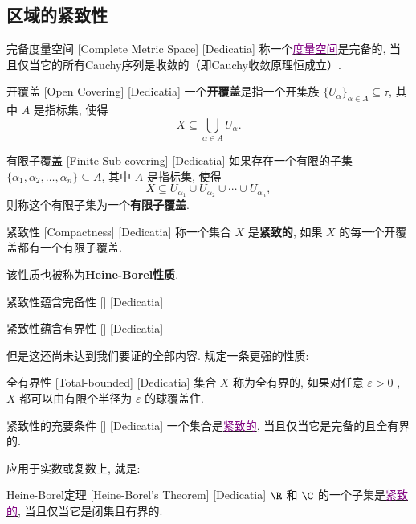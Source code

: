 \documentclass[UTF8]{ctexart}
\newcommand{\hyperrefc}[2]{\hyperref[#1]{\textcolor{purple}{#2}}}
\begin{document}
\subsection{区域的紧致性}
\begin{dfn}
    [UUID]
    {完备度量空间}
    [Complete Metric Space]
    [Dedicatia]
    称一个\hyperrefc{dfn:MetricSpace}{度量空间}是完备的, 当且仅当它的所有Cauchy序列是收敛的（即Cauchy收敛原理恒成立）. 
\end{dfn}
\begin{dfn}
    [UUID]
    {开覆盖}
    [Open Covering]
    [Dedicatia]
    一个\textbf{开覆盖}是指一个开集族 \( \{U_\alpha\}_{\alpha \in A} \subseteq \tau \), 其中 \( A \) 是指标集, 使得
    \[X \subseteq \bigcup_{\alpha \in A} U_\alpha.\]
\end{dfn}
\begin{dfn}
    [UUID]
    {有限子覆盖}
    [Finite Sub-covering]
    [Dedicatia]
    如果存在一个有限的子集 \( \{\alpha_1, \alpha_2, \ldots, \alpha_n\} \subseteq A \), 其中 \( A \) 是指标集, 使得
    \[X \subseteq U_{\alpha_1} \cup U_{\alpha_2} \cup \cdots \cup U_{\alpha_n},\]
    则称这个有限子集为一个\textbf{有限子覆盖}. 
\end{dfn}
\begin{dfn}
    [Compactness]
    {紧致性}
    [Compactness]
    [Dedicatia]
    称一个集合 \( X \) 是\textbf{紧致的}, 如果 \(X\) 的每一个开覆盖都有一个有限子覆盖.
\end{dfn}
该性质也被称为\textbf{Heine-Borel性质}. 
\begin{thm}
    [UUID]
    {紧致性蕴含完备性}
    []
    [Dedicatia]
\end{thm}
\begin{thm}
    [UUID]
    {紧致性蕴含有界性}
    []
    [Dedicatia]
\end{thm}
但是这还尚未达到我们要证的全部内容. 规定一条更强的性质: 
\begin{dfn}
    [UUID]
    {全有界性}
    [Total-bounded]
    [Dedicatia]
    集合 \( X \) 称为全有界的, 如果对任意 \( \varepsilon>0 \) ,  \( X \) 都可以由有限个半径为 \( \varepsilon \) 的球覆盖住. 
\end{dfn}
\begin{thm}
    [UUID]
    {紧致性的充要条件}
    []
    [Dedicatia]
    一个集合是\hyperrefc{dfn:Compactness}{紧致的}, 当且仅当它是完备的且全有界的. 
\end{thm}
应用于实数或复数上, 就是:
\begin{xmp}
    [UUID]
    {Heine-Borel定理}
    [Heine-Borel's Theorem]
    [Dedicatia]
     \( \R \) 和 \( \C \) 的一个子集是\hyperrefc{dfn:Compactness}{紧致的}, 当且仅当它是闭集且有界的. 
\end{xmp}
\end{document}
